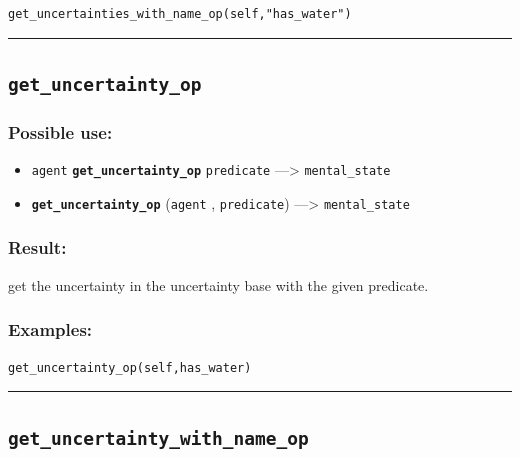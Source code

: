 \documentclass[]{book}
\providecommand{\tightlist}{%
  \setlength{\itemsep}{0pt}\setlength{\parskip}{0pt}}
\theoremstyle{definition}
\theoremstyle{definition}
\theoremstyle{definition}
\theoremstyle{remark}
\begin{document}
\begin{verbatim}
get_uncertainties_with_name_op(self,"has_water") 
\end{verbatim}

\begin{center}\rule{0.5\linewidth}{\linethickness}\end{center}

\subsection{\texorpdfstring{\texttt{get\_uncertainty\_op}}{get\_uncertainty\_op}}\label{get_uncertainty_op}

\subsubsection{Possible use:}\label{possible-use-234}

\begin{itemize}
\tightlist
\item
  \texttt{agent} \textbf{\texttt{get\_uncertainty\_op}}
  \texttt{predicate} ---\textgreater{} \texttt{mental\_state}
\item
  \textbf{\texttt{get\_uncertainty\_op}} (\texttt{agent} ,
  \texttt{predicate}) ---\textgreater{} \texttt{mental\_state}
\end{itemize}

\subsubsection{Result:}\label{result-226}

get the uncertainty in the uncertainty base with the given predicate.

\subsubsection{Examples:}\label{examples-179}

\begin{verbatim}
get_uncertainty_op(self,has_water) 
\end{verbatim}

\begin{center}\rule{0.5\linewidth}{\linethickness}\end{center}

\subsection{\texorpdfstring{\texttt{get\_uncertainty\_with\_name\_op}}{get\_uncertainty\_with\_name\_op}}\label{get_uncertainty_with_name_op}
\end{document}
